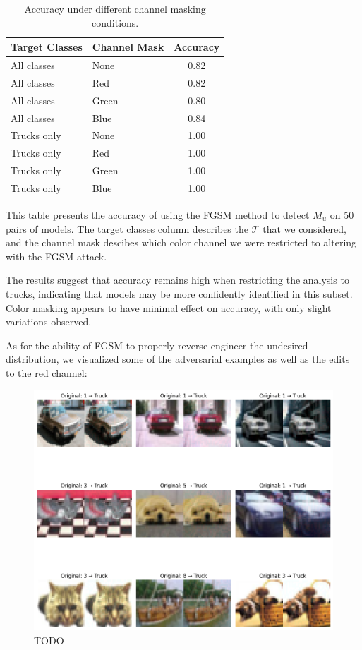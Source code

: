 \documentclass[letterpaper]{article} %
\begin{document}
\begin{table}[h!]
\centering
\begin{tabular}{|l|l|c|}
\hline
\textbf{Target Classes} & \textbf{Channel Mask} & \textbf{Accuracy} \\
\hline
All classes    & None  & 0.82 \\
All classes    & Red   & 0.82 \\
All classes    & Green & 0.80 \\
All classes    & Blue  & 0.84 \\
Trucks only    & None  & 1.00 \\
Trucks only    & Red   & 1.00 \\
Trucks only    & Green & 1.00 \\
Trucks only    & Blue  & 1.00 \\
\hline
\end{tabular}
\caption{Accuracy under different channel masking conditions.}
\label{tab:channel-mask-accuracy}
\end{table}

This table presents the accuracy of using the FGSM method to detect $M_u$ on 50 pairs of models. The target classes column describes the $\mathcal{T}$ that we considered, and the channel mask descibes which color channel we were restricted to altering with the FGSM attack.

The results suggest that accuracy remains high when restricting the analysis to trucks, indicating that models may be more confidently identified in this subset. Color masking appears to have minimal effect on accuracy, with only slight variations observed.

As for the ability of FGSM to properly reverse engineer the undesired distribution, we visualized some of the adversarial examples as well as the edits to the red channel:

\begin{figure}[h!]
\centering
\includegraphics[width=\columnwidth]{figures/round_1_FGSM_reverse_eng.png}
\caption{TODO}
\end{figure}
\end{document}
